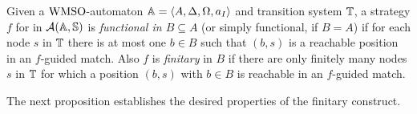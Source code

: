 \begin{definition}\label{def:StratfunctionalFinitary}
Given a $\mathrm{WMSO}$-automaton $\mathbb{A} = \langle{A,\Delta,\Omega,a_I}\rangle$ and transition system $\mathbb{T}$, a strategy $f$ for \eloise in $\mathcal{A}(\mathbb{A},\mathbb{S})$ is \emph{functional in $B \subseteq A$} (or simply functional, if $B=A$) if for each node $s$ in $\mathbb{T}$ there is at most one $b \in B$ such that $(b,s)$ is a reachable position in an $f$-guided match. Also $f$ is \emph{finitary} in $B$ if there are only finitely many nodes $s$ in $\mathbb{T}$ for which a position $(b,s)$ with $b \in B$ is reachable in an $f$-guided match.
\end{definition}



The next proposition establishes the desired properties of the finitary
construct.

